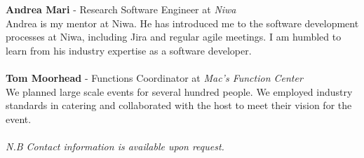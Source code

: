 \documentclass[9pt]{developercv}
\begin{document}


{
	\textbf{Andrea Mari} - Research Software Engineer at \emph{Niwa} \\
	Andrea is my mentor at Niwa. He has introduced me to the software development processes at Niwa, including Jira and regular agile meetings. I am humbled to learn from his industry expertise as a software developer.\\\\
}
{
	\textbf{Tom Moorhead} - Functions Coordinator at \emph{Mac's Function Center} \\
	We planned large scale events for several hundred people. We employed industry standards in catering and collaborated with the host to meet their vision for the event. \\\\
}
\emph{N.B Contact information is available upon request.}



\end{document}
